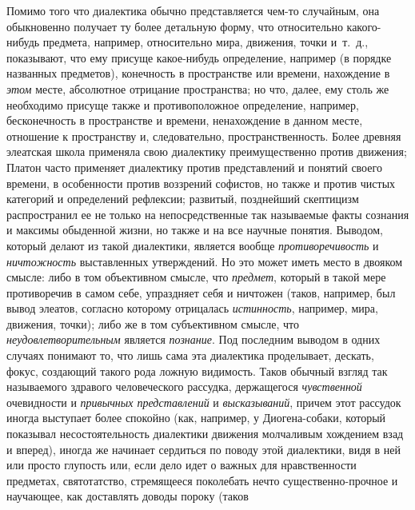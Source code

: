 Помимо того что диалектика обычно представляется чем-то
случайным, она обыкновенно получает ту более детальную форму, что
относительно какого-нибудь предмета, например, относительно мира, движения,
точки и~т.~д., показывают, что ему присуще какое-нибудь определение,
например (в порядке названных предметов), конечность в пространстве или
времени, нахождение в {\em этом}
месте, абсолютное отрицание пространства; но что, далее, ему
столь же необходимо присуще также и противоположное определение, например,
бесконечность в пространстве и времени, ненахождение в данном месте,
отношение к пространству и, следовательно, пространственность. Более
древняя элеатская школа применяла свою диалектику преимущественно против
движения; Платон часто применяет диалектику против представлений и понятий
своего времени, в особенности против воззрений софистов, но также и против
чистых категорий и определений рефлексии; развитый, позднейший скептицизм
распространил ее не только на непосредственные так называемые факты
сознания и максимы обыденной жизни, но также и на все научные понятия.
Выводом, который делают из такой диалектики, является вообще
{\em противоречивость} и {\em ничтожность}
выставленных утверждений. Но это может иметь место в двояком
смысле: либо в том объективном смысле, что {\em предмет}, который в
такой мере противоречив в самом себе, упраздняет себя и ничтожен (таков,
например, был вывод элеатов, согласно которому отрицалась {\em истинность},
например, мира, движения, точки); либо же в том субъективном
смысле, что {\em неудовлетворительным} является {\em познание}.
Под последним выводом в одних случаях понимают то, что лишь
сама эта диалектика проделывает, дескать, фокус, создающий такого рода
ложную видимость. Таков обычный взгляд так называемого здравого
человеческого рассудка, держащегося {\em чувственной} очевидности и
{\em привычных представлений} и {\em высказываний},
причем этот рассудок иногда выступает более спокойно (как, например, у
Диогена-собаки,
который показывал несостоятельность диалектики движения
молчаливым хождением взад и вперед), иногда же начинает сердиться по поводу
этой диалектики, видя в ней или просто глупость или, если дело идет о
важных для нравственности предметах, святотатство, стремящееся поколебать
нечто существенно-прочное и научающее, как доставлять доводы пороку (таков
